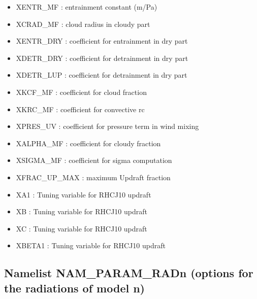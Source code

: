 \begin{itemize}
\item
{}
XENTR\_MF : entrainment constant (m/Pa)
\item
{}
XCRAD\_MF : cloud radius in cloudy part
\item
{}
XENTR\_DRY : coefficient for entrainment in dry part
\item
{}
XDETR\_DRY : coefficient for detrainment in dry part
\item
{}
XDETR\_LUP : coefficient for detrainment in dry part
\item
{}
XKCF\_MF : coefficient for cloud fraction
\item
{}
XKRC\_MF : coefficient for convective rc
{}
\item
{}
XPRES\_UV : coefficient for pressure term in wind mixing
\item
{}
XALPHA\_MF : coefficient for cloudy fraction
\item
{}
XSIGMA\_MF : coefficient for sigma computation
\item
{}
XFRAC\_UP\_MAX : maximum Updraft fraction
\item
{}
XA1 : Tuning variable for RHCJ10 updraft 
\item
{}
XB : Tuning variable for RHCJ10 updraft
\item
{}
XC : Tuning variable for RHCJ10 updraft
\item
{}
XBETA1 : Tuning variable for RHCJ10 updraft
\end{itemize}
\subsection{Namelist NAM\_PARAM\_RADn (options for the radiations of model n)}

